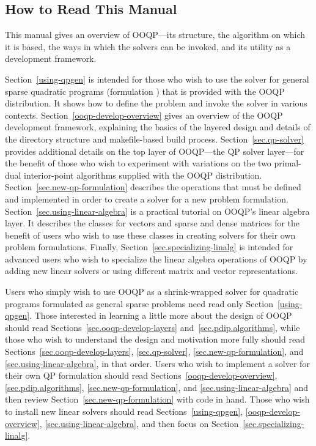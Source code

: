 \subsection{How to Read This Manual}

This manual gives an overview of OOQP---its structure,
the algorithm on which it is based, the ways in which the solvers can
be invoked, and its utility as a development framework.

Section~\ref{using-qpgen} is intended for those who wish to use the
solver for general sparse quadratic programs (formulation
) that is provided with the OOQP distribution. It shows
how to define the problem and invoke the solver in various contexts.
Section~\ref{ooqp-develop-overview} gives an overview of the OOQP
development framework, explaining the basics of the layered design and
details of the directory structure and makefile-based build process.
Section~\ref{sec.qp-solver} provides additional details on the top
layer of OOQP---the QP solver layer---for the benefit of those who
wish to experiment with variations on the two primal-dual
interior-point algorithms supplied with the OOQP distribution.
Section~\ref{sec.new-qp-formulation} describes the operations that
must be defined and implemented in order to create a solver for a new
problem formulation. Section~\ref{sec.using-linear-algebra} is a
practical tutorial on OOQP's linear algebra layer. It describes the
classes for vectors and sparse and dense matrices for the benefit of
users who wish to use these classes in creating solvers for their own
problem formulations. Finally, Section~\ref{sec.specializing-linalg}
is intended for advanced users who wish to specialize the linear
algebra operations of OOQP by adding new linear solvers or using
different matrix and vector representations.

Users who simply wish to use OOQP as a shrink-wrapped solver for 
quadratic programs formulated as general sparse problems  
need read only Section~\ref{using-qpgen}.  Those interested in 
learning a little more about the design of OOQP should read 
Sections~\ref{sec.ooqp-develop-layers} and~\ref{sec.pdip.algorithms}, 
while those who wish to understand the design and motivation more 
fully should read Sections~\ref{sec.ooqp-develop-layers}, 
\ref{sec.qp-solver}, \ref{sec.new-qp-formulation}, and 
\ref{sec.using-linear-algebra}, in that order.  Users who wish to 
implement a solver for their own QP formulation should read 
Sections~\ref{ooqp-develop-overview}, \ref{sec.pdip.algorithms}, 
\ref{sec.new-qp-formulation}, and \ref{sec.using-linear-algebra} and 
then review Section~\ref{sec.new-qp-formulation} with code in hand.  
Those who wish to install new linear solvers should read 
Sections~\ref{using-qpgen}, \ref{ooqp-develop-overview}, 
\ref{sec.using-linear-algebra}, and then focus on 
Section~\ref{sec.specializing-linalg}.

